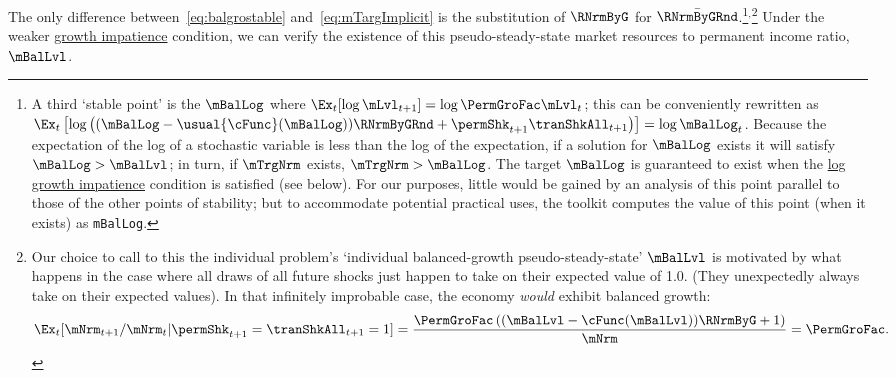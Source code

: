 \documentclass[BufferStockTheory]{subfiles}
\begin{document}
The only difference between~\eqref{eq:balgrostable} and~\eqref{eq:mTargImplicit} is the substitution of $\RNrmByG$ for $\bar{\RNrmByGRnd}$.\footnote{A third `stable point' is the $\mBalLog$ where $\Ex_{t}[\log \mLvl_{t+1}] = \log \PermGroFac \mLvl_{t}$; this can be conveniently rewritten as $\Ex_{t}\left[\log\left((\mBalLog-\usual{\cFunc}(\mBalLog))\RNrmByGRnd+\permShk_{t+1}\tranShkAll_{t+1}\right)\right]  = \log \mBalLog_{t}$.
Because the expectation of the log of a stochastic variable is less than the log of the expectation, if a solution for $\mBalLog$ exists it will satisfy $\mBalLog > \mBalLvl$; in turn, if $\mTrgNrm$ exists, $\mTrgNrm>\mBalLog$.
The target $\mBalLog$ is guaranteed to exist when the \hyperlink{GICSdl}{log growth impatience} condition is satisfied (see below).
For our purposes, little would be gained by an analysis of this point parallel to those of the other points of stability; but to accommodate potential practical uses,  the {\ARKurl} toolkit computes the value of this point (when it exists) as \texttt{mBalLog}.}$^{,}$\footnote{Our choice to call to this the individual problem's `individual balanced-growth pseudo-steady-state' $\mBalLvl$ is motivated by what happens in the case where all draws of all future shocks just happen to take on their expected value of 1.0.
(They unexpectedly always take on their expected values).
In that infinitely improbable case, the economy \textit{would} exhibit balanced growth:
  \begin{align*}
    \Ex_{t}[\mNrm_{t+1}/\mNrm_{t}|\permShk_{t+1}=\tranShkAll_{t+1}=1] = \frac{\PermGroFac \left((\mBalLvl-\cFunc(\mBalLvl))\RNrmByG + 1 \right)}{\mNrm} = \PermGroFac.
  \end{align*}}
Under the weaker  \hyperlink{GIC}{growth impatience} condition, we can verify the existence of this pseudo-steady-state market resources to permanent income ratio, $\mBalLvl$. 
\end{document}
